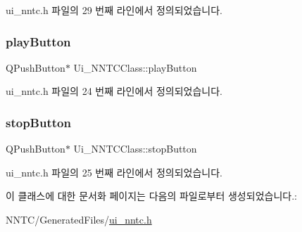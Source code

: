ui\+\_\+nntc.\+h 파일의 29 번째 라인에서 정의되었습니다.

\mbox{\label{class_ui___n_n_t_c_class_a6e604f467f5d7264f8d23f0cf54a6fdf}} 
\subsubsection{\texorpdfstring{play\+Button}{playButton}}
{\footnotesize\ttfamily Q\+Push\+Button$\ast$ Ui\+\_\+\+N\+N\+T\+C\+Class\+::play\+Button}



ui\+\_\+nntc.\+h 파일의 24 번째 라인에서 정의되었습니다.

\mbox{\label{class_ui___n_n_t_c_class_a748e190a62458531e66a574cc556e32d}} 
\subsubsection{\texorpdfstring{stop\+Button}{stopButton}}
{\footnotesize\ttfamily Q\+Push\+Button$\ast$ Ui\+\_\+\+N\+N\+T\+C\+Class\+::stop\+Button}



ui\+\_\+nntc.\+h 파일의 25 번째 라인에서 정의되었습니다.



이 클래스에 대한 문서화 페이지는 다음의 파일로부터 생성되었습니다.\+:\begin{DoxyCompactItemize}
\item 
N\+N\+T\+C/\+Generated\+Files/\mbox{\hyperlink{ui__nntc_8h}{ui\+\_\+nntc.\+h}}\end{DoxyCompactItemize}
